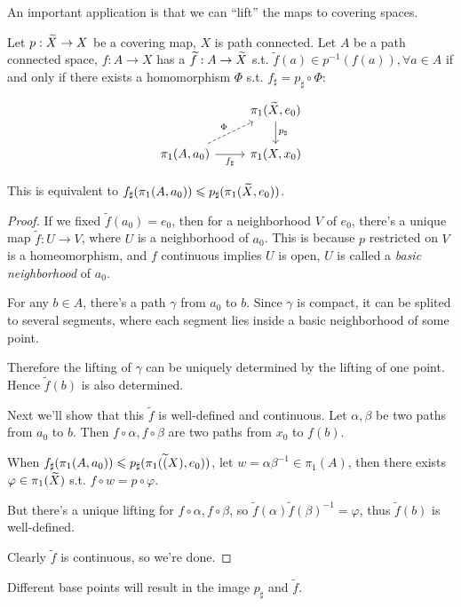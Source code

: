 An important application is that we can ``lift'' the maps to covering spaces.
\begin{theorem}
    Let $p: \widetilde{X} \to X$ be a covering map, $X$ is path connected.
	Let $A$ be a path connected space, $f: A\to X$ has a 
	$\widetilde{f}: A\to \widetilde{X}$ s.t. $\tilde f(a)\in p^{-1}(f(a)), \forall a\in A$ if
	and only if there exists a homomorphism $\Phi$ s.t. $f_\sharp=p_\sharp\circ\Phi$:
	\begin{equation*}
	\begin{tikzcd}
		&\pi_1(\wt{X}, e_0)\dar["p_\sharp"]\\
		\pi_1(A, a_0)\rar["f_\sharp"']\urar[dashed, "\Phi"] &\pi_1(X, x_0)
	\end{tikzcd}
	\end{equation*}

	This is equivalent to $f_\sharp(\pi_1(A, a_0)) \leqslant
	p_\sharp(\pi_1(\widetilde{X}, e_0))$.
\end{theorem}
\begin{proof}[Proof]
    If we fixed $\tilde f(a_0) = e_0$, then for a neighborhood $V$ of $e_0$,
	there's a unique map $\tilde f: U\to V$, where $U$ is a neighborhood of $a_0$.
	This is because $p$ restricted on $V$ is a homeomorphism,
	and $f$ continuous implies $U$ is open, $U$ is called
	a \textit{basic neighborhood} of $a_0$.

	For any $b\in A$, there's a path $\gamma$ from $a_0$ to $b$.
	Since $\gamma$ is compact, it can be splited to several segments,
	where each segment lies inside a basic neighborhood of some point.

	Therefore the lifting of $\gamma$ can be uniquely determined by
	the lifting of one point. Hence $\tilde f(b)$ is also determined.
	\bigskip

	Next we'll show that this $\tilde f$ is well-defined and continuous.
	Let $\alpha, \beta$ be two paths from $a_0$ to $b$.
	Then $f\circ \alpha, f\circ \beta$ are two paths from $x_0$ to $f(b)$.

	When $f_\sharp(\pi_1(A, a_0)) \leqslant p_\sharp(\pi_1(\widetilde{(}X), e_0))$,
	let $w = \alpha \beta^{-1}\in \pi_1(A)$,
	then there exists $\varphi\in \pi_1(\widetilde{X})$ s.t. $f\circ w = p\circ \varphi$.

	But there's a unique lifting for $f\circ \alpha, f\circ \beta$,
	so $\tilde f(\alpha)\tilde f(\beta)^{-1} = \varphi$,
	thus $\tilde f(b)$ is well-defined.

	Clearly $\tilde f$ is continuous, so we're done.
\end{proof}
\begin{remark}
    Different base points will result in the image $p_\sharp$ and  $\tilde f$.
\end{remark}

